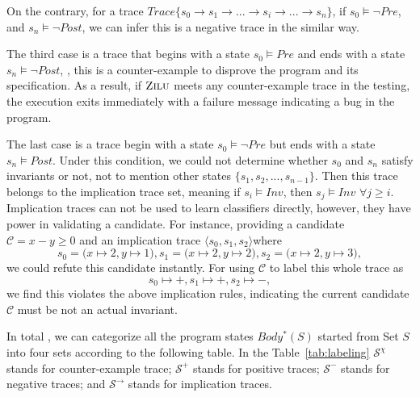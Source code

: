 On the contrary, for a trace $Trace\{s_0 \to s_1 \to ...\to s_i \to ... \to s_n\}$, 
if $s_0 \models \neg Pre$, and $s_n \models \neg Post$,
we can infer this is a negative trace in the similar way. 


The third case is a trace that begins with a state $s_0 \models Pre$ and ends with a state $s_n \models \neg Post$,
, this is a counter-example to disprove the program and its specification.
As a result, if $\textsc{Zilu}$ meets any counter-example trace in the testing, 
the execution exits immediately with a failure message indicating a bug in the program. 

The last case is a trace begin with a state $s_0 \models \neg Pre$ but ends with a state $s_n \models Post$.
Under this condition, we could not determine whether $s_0$ and $s_n$ satisfy invariants or not,
not to mention other states $\{s_1, s_2, ..., s_{n-1}\}$.
Then this trace belongs to the implication trace set, meaning if $s_i \models Inv$, then $s_j \models Inv$ $\forall j \ge i$.
Implication traces can not be used to learn classifiers directly, 
however, they have power in validating a candidate.
For instance, providing a candidate $\mathcal{C} = x - y \ge 0$ and an implication trace 
$\langle s_0, s_1, s_2\rangle$where 
$$s_0 = \big(x \mapsto 2, y \mapsto 1\big),  s_1 = \big(x \mapsto 2, y \mapsto 2\big),  s_2 = \big(x \mapsto 2, y \mapsto 3\big),$$
we could refute this candidate instantly.
For using $\mathcal{C}$ to label this whole trace as $$s_0 \mapsto +,  s_1 \mapsto +,  s_2 \mapsto -,$$ 
we find this violates the above implication rules,
indicating the current candidate $\mathcal{C}$ must be not an actual invariant.


In total , we can categorize all the program states $Body^*(S)$ started from Set $S$ into four sets according to the following table.
In the Table~\ref{tab:labeling}
$\mathcal{S}^\chi$ stands for counter-example trace;
$\mathcal{S}^+$ stands for positive traces;
$\mathcal{S}^-$ stands for negative traces; 
and $\mathcal{S}^\rightarrow$ stands for implication traces.

